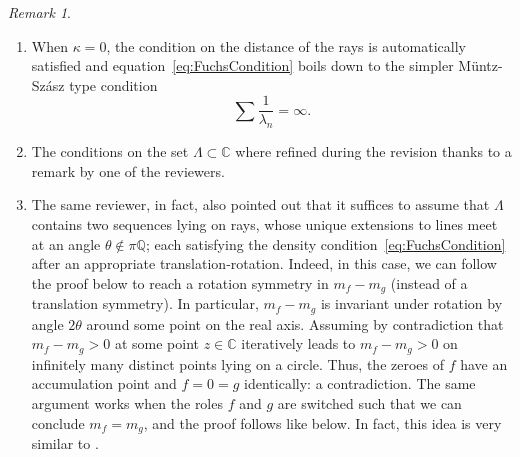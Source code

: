 \documentclass{article}
\newcommand{\bbC}{\mathbb{C}}
\theoremstyle{remark}
\newtheorem{remark}{Remark}
\begin{document}
    \begin{remark}
        \begin{enumerate}
            \item When $\kappa = 0$, the condition on the distance of the rays is automatically satisfied and equation~\ref{eq:FuchsCondition} boils down to the simpler M\"untz-Sz\'asz type condition
            \begin{equation*}
                \sum \frac{1}{\lambda_n} = \infty.
            \end{equation*}
            \item The conditions on the set $\Lambda \subset \mathbb C$ where refined during the revision thanks to a remark by one of the reviewers.
            \item The same reviewer, in fact, also pointed out that it suffices to assume that $\Lambda$ contains two sequences lying on rays, whose unique extensions to lines meet at an angle $\theta \not\in \pi \mathbb Q$; each satisfying the density condition~\eqref{eq:FuchsCondition} after an appropriate translation-rotation. Indeed, in this case, we can follow the proof below to reach a rotation symmetry in $m_f - m_g$ (instead of a translation symmetry). In particular, $m_f - m_g$ is invariant under rotation by angle $2\theta$ around some point on the real axis. Assuming by contradiction that $m_f - m_g > 0$ at some point $z \in \bbC$ iteratively leads to $m_f - m_g > 0$ on infinitely many distinct points lying on a circle. Thus, the zeroes of $f$ have an accumulation point and $f = 0 = g$ identically: a contradiction. The same argument works when the roles $f$ and $g$ are switched such that we can conclude $m_f = m_g$, and the proof follows like below. In fact, this idea is very similar to \cite[Theorem~3.3 on p.~419]{Jaming2014Uniqueness}.
        \end{enumerate}
    \end{remark}
\end{document}

